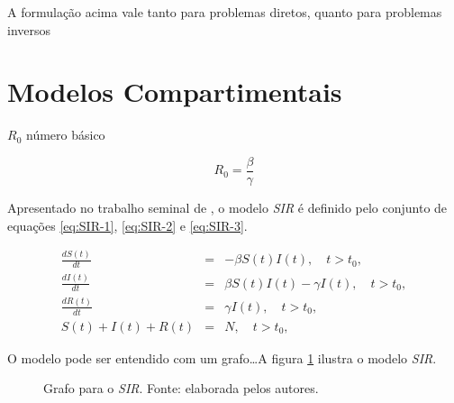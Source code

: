 A formulação acima vale tanto para problemas diretos, quanto para problemas 
inversos

\section{Modelos Compartimentais}

$R_0$ número básico

\begin{equation}
    R_0 = \frac{\beta}{\gamma}
\end{equation}

Apresentado no trabalho seminal de \cite{kermack-mcKendrick:1927}, o modelo 
\textit{SIR} é definido pelo conjunto de equações \ref{eq:SIR-1}, \ref{eq:SIR-2}
e \ref{eq:SIR-3}.

\begin{eqnarray}\label{eq:sir}
   \frac{dS(t)}{dt} &=& -\beta S(t) I(t),  \quad t > t_0, \label{eq:SIR-1}\\
   \frac{dI(t)}{dt} &=& \beta S(t) I(t) - \gamma I(t), \quad t > t_0, \label{eq:SIR-2}\\
   \frac{dR(t)}{dt} &=& \gamma I(t),  \quad t > t_0, \label{eq:SIR-3} \\
   S(t) + I(t) + R(t) &=& N,  \quad t > t_0, \label{eq:SIR-4}
\end{eqnarray}

O modelo pode ser entendido com um grafo\dots A figura \ref{fig:sir-grafo}
ilustra o modelo \textit{SIR}.

\begin{figure}
\centering
{}
\caption{Grafo para o \textit{SIR}. Fonte: elaborada pelos autores.}
\label{fig:sir-grafo}
\end{figure}



